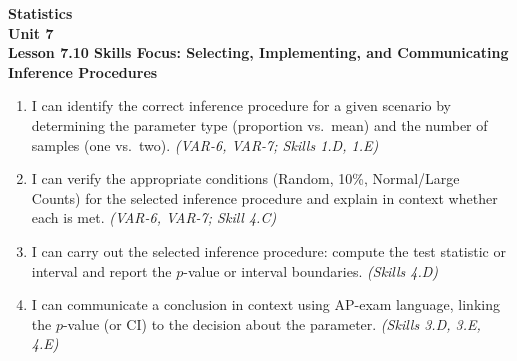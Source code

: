 \documentclass[10pt]{article}
\begin{document}
\vspace{-0.8in}

\begin{center}
  {\color{white}\textbf{\LARGE Statistics}}\\[4pt]
  {\color{skymid}\large\textbf{Unit 7}}\\[6pt]
  {\color{white}\textbf{\large Lesson 7.10 \quad Skills Focus: Selecting, Implementing, and Communicating Inference Procedures}}
\end{center}

\vspace{0.22in}
\namedateperiod
\vspace{0.18in}

\begin{learningtargetbox}
\small
\begin{enumerate}[leftmargin=1.5em, itemsep=5pt]
  \item I can identify the correct inference procedure for a given scenario by determining
        the parameter type (proportion vs.\ mean) and the number of samples (one vs.\ two).
        \textit{(VAR-6, VAR-7; Skills 1.D, 1.E)}
  \item I can verify the appropriate conditions (Random, 10\%, Normal/Large Counts) for the
        selected inference procedure and explain in context whether each is met.
        \textit{(VAR-6, VAR-7; Skill 4.C)}
  \item I can carry out the selected inference procedure: compute the test statistic or
        interval and report the $p$-value or interval boundaries.
        \textit{(Skills 4.D)}
  \item I can communicate a conclusion in context using AP-exam language, linking the
        $p$-value (or CI) to the decision about the parameter.
        \textit{(Skills 3.D, 3.E, 4.E)}
\end{enumerate}
\end{learningtargetbox}

\vspace{0.14in}
\end{document}

